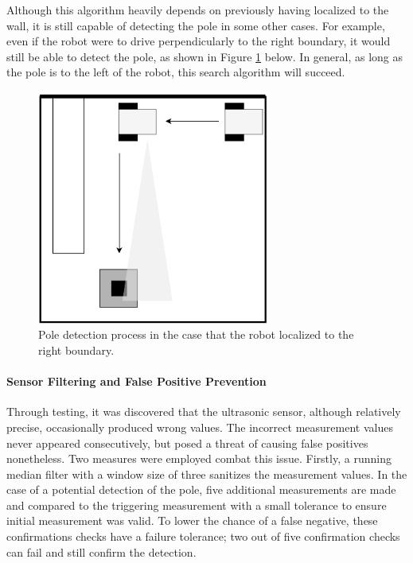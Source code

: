 \documentclass[ece]{uw-wkrpt}
\begin{document}
Although this algorithm heavily depends on previously having localized to the wall, it is still capable of detecting the pole in some other cases. For example, even if the robot were to drive perpendicularly to the right boundary, it would still be able to detect the pole, as shown in Figure \ref{fig:SAEX3} below. In general, as long as the pole is to the left of the robot, this search algorithm will succeed.

\begin{figure}
    \centering
    \includegraphics[width=3in]{res/SA-example3}
    \caption[Pole detection from right boundary]
          {Pole detection process in the case that the robot localized to the right boundary.}
    \label{fig:SAEX3}
\end{figure}

\paragraph{Sensor Filtering and False Positive Prevention}

Through testing, it was discovered that the ultrasonic sensor, although relatively precise, occasionally produced wrong values. The incorrect measurement values never appeared consecutively, but posed a threat of causing false positives nonetheless. Two measures were employed combat this issue. Firstly, a running median filter with a window size of three sanitizes the measurement values. In the case of a potential detection of the pole, five additional measurements are made and compared to the triggering measurement with a small tolerance to ensure initial measurement was valid. To lower the chance of a false negative, these confirmations checks have a failure tolerance; two out of five confirmation checks can fail and still confirm the detection.
\end{document}
